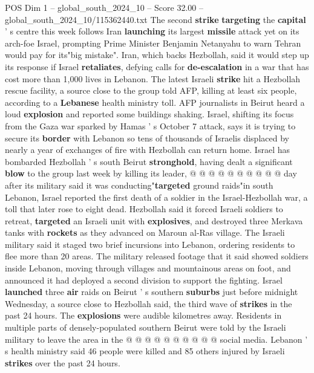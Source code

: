 \begin{textsample}{POS Dim 1 – global\_south\_2024\_10 – Score 32.00 – global\_south\_2024\_10/115362440.txt}  \label{ex:f1_pos_025}
The second \textbf{strike} \textbf{targeting} the \textbf{capital} ' s centre this week follows Iran \textbf{launching} its largest \textbf{missile} attack yet on its arch-foe Israel, prompting Prime Minister Benjamin Netanyahu to warn Tehran would pay for its"big mistake".
Iran, which backs Hezbollah, said it would step up its response if Israel \textbf{retaliates}, defying calls for \textbf{de-escalation} in a war that has cost more than 1,000 lives in Lebanon.
The latest Israeli \textbf{strike} hit a Hezbollah rescue facility, a source close to the group told AFP, killing at least six people, according to a \textbf{Lebanese} health ministry toll.
AFP journalists in Beirut heard a loud \textbf{explosion} and reported some buildings shaking.
Israel, shifting its focus from the Gaza war sparked by Hamas ' s October 7 attack, says it is trying to secure its \textbf{border} with Lebanon so tens of thousands of Israelis displaced by nearly a year of exchanges of fire with Hezbollah can return home.
Israel has bombarded Hezbollah ' s south Beirut \textbf{stronghold}, having dealt a significant \textbf{blow} to the group last week by killing its leader, @ @ @ @ @ @ @ @ @ @ day after its military said it was conducting"\textbf{targeted} ground raids"in south Lebanon, Israel reported the first death of a soldier in the Israel-Hezbollah war, a toll that later rose to eight dead.
Hezbollah said it forced Israeli soldiers to retreat, \textbf{targeted} an Israeli unit with \textbf{explosives}, and destroyed three Merkava tanks with \textbf{rockets} as they advanced on Maroun al-Ras village.
The Israeli military said it staged two brief incursions into Lebanon, ordering residents to flee more than 20 areas.
The military released footage that it said showed soldiers inside Lebanon, moving through villages and mountainous areas on foot, and announced it had deployed a second division to support the fighting.
Israel \textbf{launched} three \textbf{air} raids on Beirut ' s southern \textbf{suburbs} just before midnight Wednesday, a source close to Hezbollah said, the third wave of \textbf{strikes} in the past 24 hours.
The \textbf{explosions} were audible kilometres away.
Residents in multiple parts of densely-populated southern Beirut were told by the Israeli military to leave the area in the @ @ @ @ @ @ @ @ @ @ social media.
Lebanon ' s health ministry said 46 people were killed and 85 others injured by Israeli \textbf{strikes} over the past 24 hours.

\end{textsample}
